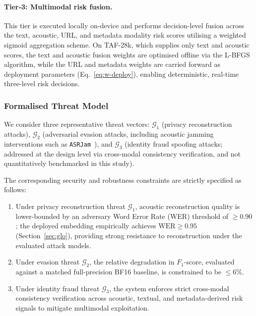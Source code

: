 \documentclass[a4paper,fleqn]{cas-sc}
\begin{document}
\paragraph{Tier-3: Multimodal risk fusion.}
This tier is executed locally on-device and performs decision-level fusion across the text, acoustic, URL, and metadata modality risk scores utilising a weighted sigmoid aggregation scheme. On TAF-28k, which supplies only text and acoustic scores, the text and acoustic fusion weights are optimised offline via the L-BFGS algorithm, while the URL and metadata weights are carried forward as deployment parameters (Eq.~\eqref{eq:w-deploy}), enabling deterministic, real-time three-level risk decisions.

\subsubsection{Formalised Threat Model}\label{Formalised_Threat_Model}

We consider three representative threat vectors: $\mathcal{G}_1$ (privacy reconstruction attacks), $\mathcal{G}_2$ (adversarial evasion attacks, including acoustic jamming interventions such as \texttt{ASRJam}~\citep{19}), and $\mathcal{G}_3$ (identity fraud spoofing attacks; addressed at the design level via cross-modal consistency verification, and not quantitatively benchmarked in this study).

The corresponding security and robustness constraints are strictly specified as follows:
\begin{enumerate}
    \item[\text{(i)}] Under privacy reconstruction threat $\mathcal{G}_1$, acoustic reconstruction quality is lower-bounded by an adversary Word Error Rate (WER) threshold of $\ge 0.90$; the deployed embedding empirically achieves $\text{WER} \ge 0.95$ (Section~\ref{sec:glo}), providing strong resistance to reconstruction under the evaluated attack models.
    \item[\text{(ii)}] Under evasion threat $\mathcal{G}_2$, the relative degradation in $F_1$-score, evaluated against a matched full-precision BF16 baseline, is constrained to be $\le 6\%$.
    \item[\text{(iii)}] Under identity fraud threat $\mathcal{G}_3$, the system enforces strict cross-modal consistency verification across acoustic, textual, and metadata-derived risk signals to mitigate multimodal exploitation.
\end{enumerate}
\end{document}

